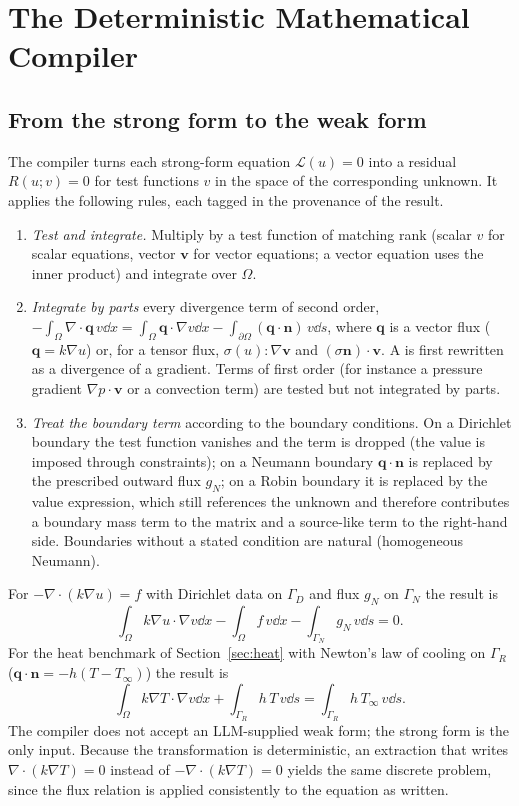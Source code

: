 \section{The Deterministic Mathematical Compiler}
\label{sec:compiler}

\subsection{From the strong form to the weak form}
The compiler turns each strong-form equation $\mathcal L(u)=0$ into a residual $R(u;v)=0$ for test functions $v$ in the space of the corresponding unknown. It applies the following rules, each tagged in the provenance of the result.
\begin{enumerate}
\item \emph{Test and integrate.} Multiply by a test function of matching rank (scalar $v$ for scalar equations, vector $\mathbf v$ for vector equations; a vector equation uses the inner product) and integrate over $\Omega$.
\item \emph{Integrate by parts} every divergence term of second order, $-\int_\Omega\nabla\cdot\mathbf q\,v\dd x=\int_\Omega\mathbf q\cdot\nabla v\dd x-\int_{\partial\Omega}(\mathbf q\cdot\mathbf n)\,v\dd s$, where $\mathbf q$ is a vector flux ($\mathbf q=k\nabla u$) or, for a tensor flux, $\sigma(u):\nabla\mathbf v$ and $(\sigma\mathbf n)\cdot\mathbf v$. A  is first rewritten as a divergence of a gradient. Terms of first order (for instance a pressure gradient $\nabla p\cdot\mathbf v$ or a convection term) are tested but not integrated by parts.
\item \emph{Treat the boundary term} according to the boundary conditions. On a Dirichlet boundary the test function vanishes and the term is dropped (the value is imposed through constraints); on a Neumann boundary $\mathbf q\cdot\mathbf n$ is replaced by the prescribed outward flux $g_N$; on a Robin boundary it is replaced by the value expression, which still references the unknown and therefore contributes a boundary mass term to the matrix and a source-like term to the right-hand side. Boundaries without a stated condition are natural (homogeneous Neumann).
\end{enumerate}
For $-\nabla\cdot(k\nabla u)=f$ with Dirichlet data on $\Gamma_D$ and flux $g_N$ on $\Gamma_N$ the result is
\begin{equation}
\int_\Omega k\nabla u\cdot\nabla v\dd x-\int_\Omega f\,v\dd x-\int_{\Gamma_N}g_N\,v\dd s=0 .
\end{equation}
For the heat benchmark of Section~\ref{sec:heat} with Newton's law of cooling on $\Gamma_R$ ($\mathbf q\cdot\mathbf n=-h(T-T_\infty)$) the result is
\begin{equation}
\int_\Omega k\nabla T\cdot\nabla v\dd x+\int_{\Gamma_R}h\,T\,v\dd s=\int_{\Gamma_R}h\,T_\infty\,v\dd s .
\end{equation}
The compiler does not accept an LLM-supplied weak form; the strong form is the only input. Because the transformation is deterministic, an extraction that writes $\nabla\cdot(k\nabla T)=0$ instead of $-\nabla\cdot(k\nabla T)=0$ yields the same discrete problem, since the flux relation is applied consistently to the equation as written.

